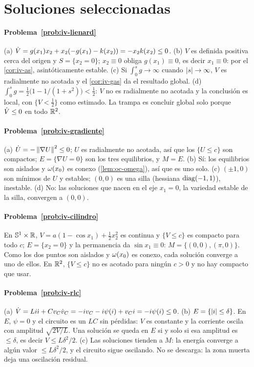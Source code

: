 \section{Soluciones seleccionadas}

\paragraph{Problema~\ref{prob:iv-lienard}}
(a) $\dot V=g(x_1)x_2+x_2(-g(x_1)-k(x_2))=-x_2k(x_2)\le0$. (b) $V$ es definida positiva cerca del origen y $S=\{x_2=0\}$; $x_2\equiv0$ obliga $g(x_1)\equiv0$, es decir $x_1\equiv0$: por el \cref{cor:iv-as}, asintóticamente estable. (c) Si $\int_0^sg\to\infty$ cuando $\left\lvert s\right\rvert\to\infty$, $V$ es radialmente no acotada y el \cref{cor:iv-gas} da el resultado global. (d) $\int_0^sg=\tfrac12\bigl(1-1/(1+s^2)\bigr)<\tfrac12$: $V$ no es radialmente no acotada y la conclusión es local, con $\{V<\tfrac12\}$ como estimado. La trampa es concluir global solo porque $\dot V\le0$ en todo $\mathbb{R}^2$.

\paragraph{Problema~\ref{prob:iv-gradiente}}
(a) $\dot U=-\left\lVert \nabla U\right\rVert^2\le0$; $U$ es radialmente no acotada, así que los $\{U\le c\}$ son compactos; $E=\{\nabla U=0\}$ son los tres equilibrios, y $M=E$. (b) Sí: los equilibrios son aislados y $\omega(x_0)$ es conexo (\cref{lem:oc-omega}), así que es uno solo. (c) $(\pm1,0)$ son mínimos de $U$ y estables; $(0,0)$ es una silla (hessiana $\operatorname{diag}(-1,1)$), inestable. (d) No: las soluciones que nacen en el eje $x_1=0$, la variedad estable de la silla, convergen a $(0,0)$.

\paragraph{Problema~\ref{prob:iv-cilindro}}
En $\mathbb S^1\times\mathbb{R}$, $V=a(1-\cos x_1)+\tfrac12x_2^2$ es continua y $\{V\le c\}$ es compacto para todo $c$; $E=\{x_2=0\}$ y la permanencia da $\sin x_1\equiv0$: $M=\{(0,0),(\pi,0)\}$. Como los dos puntos son aislados y $\omega(x_0)$ es conexo, cada solución converge a uno de ellos. En $\mathbb{R}^2$, $\{V\le c\}$ no es acotado para ningún $c>0$ y no hay compacto que usar.

\paragraph{Problema~\ref{prob:iv-rlc}}
(a) $\dot V=Li\dot\imath+Cv_C\dot v_C=-iv_C-i\psi(i)+v_Ci=-i\psi(i)\le0$. (b) $E=\{\left\lvert i\right\rvert\le\delta\}$. En $E$, $\psi=0$ y el circuito es un $LC$ sin pérdidas: $V$ es constante y la corriente oscila con amplitud $\sqrt{2V/L}$. Una solución se queda en $E$ si y solo si esa amplitud es $\le\delta$, es decir $V\le L\delta^2/2$. (c) Las soluciones tienden a $M$: la energía converge a algún valor $\le L\delta^2/2$, y el circuito sigue oscilando. No se descarga: la zona muerta deja una oscilación residual.

